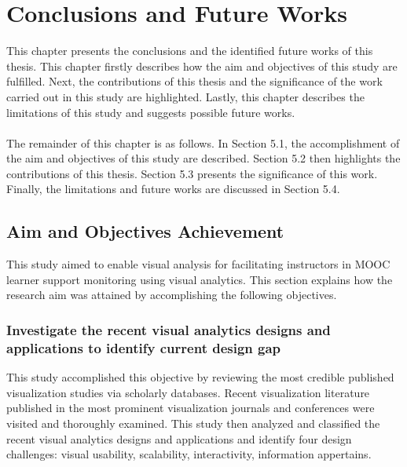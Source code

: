 
\chapter{Conclusions and Future Works}

This chapter presents the conclusions and the identified future works of this thesis. This chapter firstly describes how the aim and objectives of this study are fulfilled. Next, the contributions of this thesis and the significance of the work carried out in this study are highlighted. Lastly, this chapter describes the limitations of this study and suggests possible future works.
\\ \\ \indent
The remainder of this chapter is as follows. In Section 5.1, the accomplishment of the aim and objectives of this study are described. Section 5.2 then highlights the contributions of this thesis. Section 5.3 presents the significance of this work. Finally, the limitations and future works are discussed in Section 5.4.

\section{Aim and Objectives Achievement}
This study aimed to enable visual analysis for facilitating instructors in MOOC learner support monitoring using visual analytics. This section explains how the research aim was attained by accomplishing the following objectives.

\subsection{Investigate the recent visual analytics designs and applications to identify current design gap}
This study accomplished this objective by reviewing the most credible published visualization studies via scholarly databases. Recent visualization literature published in the most prominent visualization journals and conferences were visited and thoroughly examined. This study then analyzed and classified the recent visual analytics designs and applications and identify four design challenges: visual usability, scalability, interactivity, information appertains.

